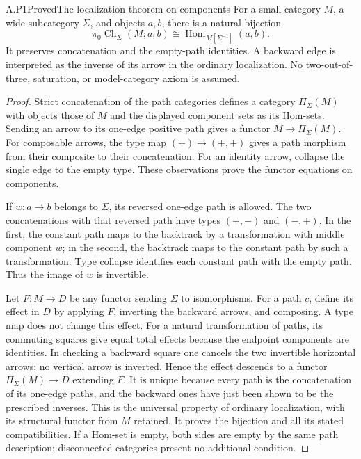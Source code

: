 \begin{result}{A.P1}{Proved}{The localization theorem on components}
For a small category $M$, a wide subcategory $\Sigma$, and objects $a,b$, there is a natural bijection
\[
 \pi_0\operatorname{Ch}_\Sigma(M;a,b)
       \cong\operatorname{Hom}_{M[\Sigma^{-1}]}(a,b).
\]
It preserves concatenation and the empty-path identities. A backward edge is interpreted as the inverse of its arrow in the ordinary localization. No two-out-of-three, saturation, or model-category axiom is assumed.
\end{result}
\begin{proof}
Strict concatenation of the path categories defines a category $\Pi_\Sigma(M)$ with objects those of $M$ and the displayed component sets as its Hom-sets. Sending an arrow to its one-edge positive path gives a functor $M\to\Pi_\Sigma(M)$. For composable arrows, the type map $(+)\to(+,+)$ gives a path morphism from their composite to their concatenation. For an identity arrow, collapse the single edge to the empty type. These observations prove the functor equations on components.

If $w:a\to b$ belongs to $\Sigma$, its reversed one-edge path is allowed. The two concatenations with that reversed path have types $(+,-)$ and $(-,+)$. In the first, the constant path maps to the backtrack by a transformation with middle component $w$; in the second, the backtrack maps to the constant path by such a transformation. Type collapse identifies each constant path with the empty path. Thus the image of $w$ is invertible.

Let $F:M\to D$ be any functor sending $\Sigma$ to isomorphisms. For a path $c$, define its effect in $D$ by applying $F$, inverting the backward arrows, and composing. A type map does not change this effect. For a natural transformation of paths, its commuting squares give equal total effects because the endpoint components are identities. In checking a backward square one cancels the two invertible horizontal arrows; no vertical arrow is inverted. Hence the effect descends to a functor $\Pi_\Sigma(M)\to D$ extending $F$. It is unique because every path is the concatenation of its one-edge paths, and the backward ones have just been shown to be the prescribed inverses. This is the universal property of ordinary localization, with its structural functor from $M$ retained. It proves the bijection and all its stated compatibilities. If a Hom-set is empty, both sides are empty by the same path description; disconnected categories present no additional condition.
\end{proof}

